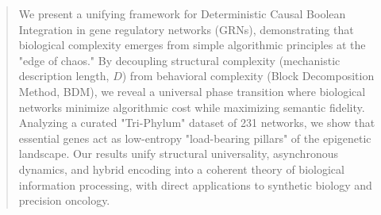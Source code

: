 
\begin{abstract}
\noindent We present a unifying framework for Deterministic Causal Boolean Integration in gene regulatory networks (GRNs), demonstrating that biological complexity emerges from simple algorithmic principles at the "edge of chaos." By decoupling structural complexity (mechanistic description length, $D$) from behavioral complexity (Block Decomposition Method, BDM), we reveal a universal phase transition where biological networks minimize algorithmic cost while maximizing semantic fidelity. Analyzing a curated "Tri-Phylum" dataset of 231 networks, we show that essential genes act as low-entropy "load-bearing pillars" of the epigenetic landscape. Our results unify structural universality, asynchronous dynamics, and hybrid encoding into a coherent theory of biological information processing, with direct applications to synthetic biology and precision oncology.
\end{abstract}
